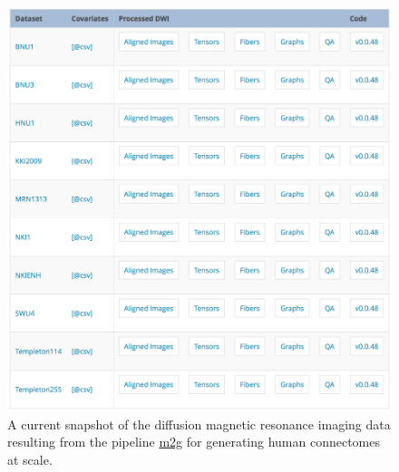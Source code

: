 \documentclass[simplex.tex]{subfiles}
\begin{document}
\begin{figure}[h!]
\begin{cframed}
\centering
\includegraphics[height=0.65\textheight]{../../figs/DiffusionMRI_data201704.png}
\caption{A current snapshot of the diffusion magnetic resonance imaging data resulting from the pipeline \href{http://m2g.io}{m2g} for generating human connectomes at scale.}
\label{fig:dmri_data201704}
\end{cframed}
\end{figure}

\clearpage
\end{document}
